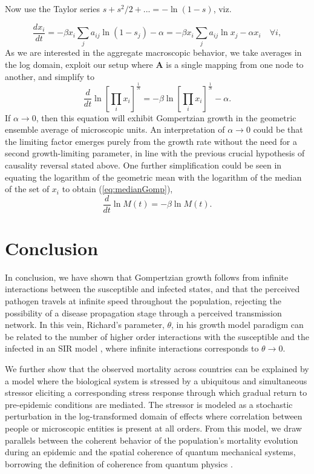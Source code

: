 \documentclass{article}
\begin{document}
Now use the Taylor series $s+s^2/2+... = -\ln(1-s)$, viz.

\begin{equation}
\frac{d x_i}{dt} = -\beta x_i\sum_j{a_{ij}}\ln{(1 - s_j)} - \alpha = -\beta x_i\sum_j{a_{ij}}\ln{x_j} - \alpha x_i \quad \forall i,
\end{equation}
As we are interested in the aggregate macroscopic behavior, we take averages in the log domain, exploit our setup where $\mathbf{A}$ is a single mapping from one node to another, and simplify to
\begin{equation}
\frac{d}{{dt}} \ln\left[\prod_i{x_i}\right]^{\frac{1}{N}} = -\beta\ln\left[\prod_i{x_i}\right]^{\frac{1}{N}} - \alpha.
\end{equation}
If $\alpha\rightarrow 0$, then this equation will exhibit Gompertzian growth in the geometric ensemble average of microscopic units. 
An interpretation of $\alpha\rightarrow 0$ could be that the limiting factor emerges purely from the growth rate without the need for a second growth-limiting parameter, in line with the previous crucial hypothesis of causality reversal stated above. One further simplification could be seen in equating the logarithm of the geometric mean with the logarithm of the median of the set of $x_i$ to obtain (\ref{eq:medianGomp}),
\begin{equation}
\frac{d}{dt}\ln{M(t)} = -\beta \ln{M(t)}.
\end{equation}



\section{Conclusion}
In conclusion, we have shown that Gompertzian growth follows from infinite interactions between the susceptible and infected states, and that the perceived pathogen travels at infinite speed throughout the population, rejecting the possibility of a disease propagation stage through a perceived transmission network. In this vein, Richard's parameter, $\theta$, in his growth model paradigm can be related to the number of higher order interactions with the susceptible and the infected in an SIR model \citep{richards1959flexible}, where infinite interactions corresponds to $\theta\rightarrow 0$. 

We further show that the observed mortality across countries can be explained by a model where the biological system is stressed by a ubiquitous and simultaneous stressor eliciting a corresponding stress response through which gradual return to pre-epidemic conditions are mediated. The stressor is modeled as a stochastic perturbation in the log-transformed domain of effects where correlation between people or microscopic entities is present at all orders. From this model, we draw parallels between the coherent behavior of the population's mortality evolution during an epidemic and the spatial coherence of quantum mechanical systems, borrowing the definition of coherence from quantum physics \citep{molski2003coherent}.
\end{document}
